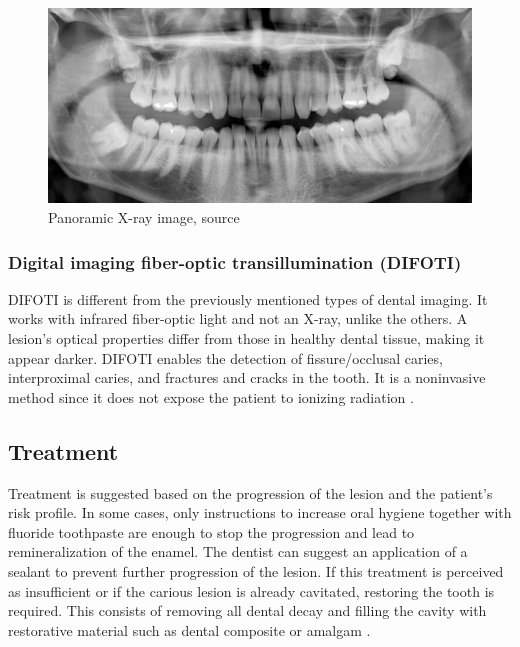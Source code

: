 \begin{figure}
    \centering
    \includegraphics[width=\linewidth]{images/panoramatic_xray.jpg}
    \caption{Panoramic X-ray image, source \cite{Panoramatic2017}}
    \label{fig:panoramatic_xray}
\end{figure}


\subsubsection{Digital imaging fiber-optic transillumination (DIFOTI)}
DIFOTI is different from the previously mentioned types of dental imaging. It works with infrared fiber-optic light and not an X-ray, unlike the others. A lesion's optical properties differ from those in healthy dental tissue, making it appear darker. DIFOTI enables the detection of fissure/occlusal caries, interproximal caries, and fractures and cracks in the tooth. It is a noninvasive method since it does not expose the patient to ionizing radiation \cite{Strassler2014}.

\subsection{Treatment}
Treatment is suggested based on the progression of the lesion and the patient's risk profile. In some cases, only instructions to increase oral hygiene together with fluoride toothpaste are enough to stop the progression and lead to remineralization of the enamel. The dentist can suggest an application of a sealant to prevent further progression of the lesion. If this treatment is perceived as insufficient or if the carious lesion is already cavitated, restoring the tooth is required. This consists of removing all dental decay and filling the cavity with restorative material such as dental composite or amalgam \cite{2019a}\cite{2015}.
